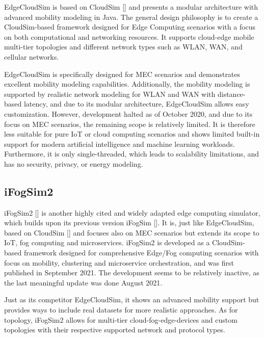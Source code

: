 EdgeCloudSim is based on CloudSim [\cite{sim-base-cloudsim}] and presents a modular architecture with advanced mobility modeling in Java.
The general design philosophy is to create a CloudSim-based framework designed for Edge Computing scenarios with a focus on both computational and networking resources.
It supports cloud-edge mobile multi-tier topologies and different network types such as WLAN, WAN, and cellular networks.

EdgeCloudSim is specifically designed for MEC scenarios and demonstrates excellent mobility modeling capabilities.
Additionally, the mobility modeling is supported by realistic network modeling for WLAN and WAN with distance-based latency, and due to its modular architecture, EdgeCloudSim allows easy customization.
However, development halted as of October 2020, and due to its focus on MEC scenarios, the remaining scope is relatively limited.
It is therefore less suitable for pure IoT or cloud computing scenarios and shows limited built-in support for modern artificial intelligence and machine learning workloads.
Furthermore, it is only single-threaded, which leads to scalability limitations, and has no security, privacy, or energy modeling.

\subsection{iFogSim2}\label{sec:iFogSim2}
iFogSim2 [\cite{sim-ifogsim2}] is another highly cited and widely adapted edge computing simulator, which builds upon its previous version iFogSim [\cite{sim-base-ifogsim1}].
It is, just like EdgeCloudSim, based on CloudSim [\cite{sim-base-cloudsim}] and focuses also on MEC scenarios but extends its scope to IoT, fog computing and microservices.
iFogSim2 is developed as a CloudSim-based framework designed for comprehensive Edge/Fog computing scenarios with focus on mobility, clustering and microservice orchestration, and was first published in September 2021.
The development seems to be relatively inactive, as the last meaningful update was done August 2021.

Just as its competitor EdgeCloudSim, it shows an advanced mobility support but provides ways to include real datasets for more realistic approaches.
As for topology, iFogSim2 allows for multi-tier cloud-fog-edge-devices and custom topologies with their respective supported network and protocol types.

